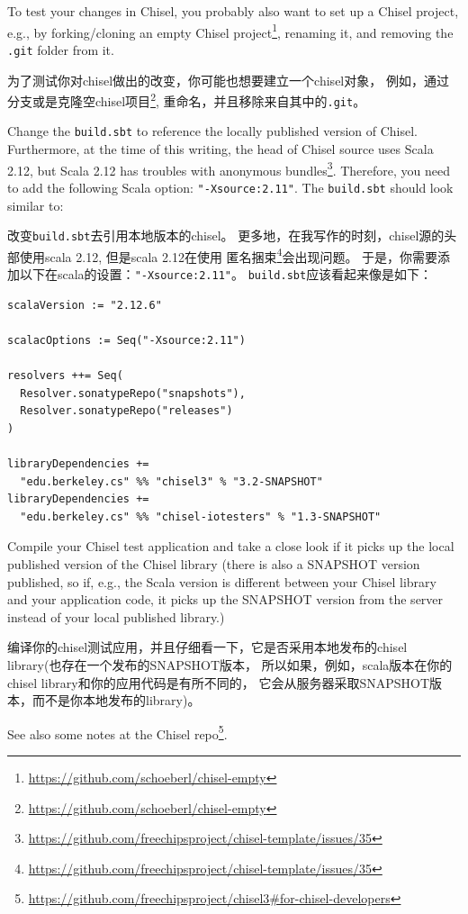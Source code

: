 \documentclass[%
    10pt,
    headinclude, footexclude,
    openright, %
    notitlepage,
    cleardoubleempty,
    headsepline,
    pointlessnumbers,
    bibtotoc, idxtotoc,
    ]{scrbook}
\newcommand{\code}[1]{{\small{\texttt{#1}}}}
\newcommand{\myref}[2]{\href{#1}{#2}}
\renewcommand{\myref}[2]{{#2}{\footnote{\url{#1}}}}
\begin{document}
To test your changes in Chisel, you probably also want to set up a Chisel project,
e.g., by forking/cloning an \myref{https://github.com/schoeberl/chisel-empty}{empty Chisel project},
renaming it, and removing the \code{.git} folder from it.

为了测试你对chisel做出的改变，你可能也想要建立一个chisel对象，
例如，通过分支或是克隆\myref{https://github.com/schoeberl/chisel-empty}{空chisel项目},
重命名，并且移除来自其中的\code{.git}。

Change the \code{build.sbt} to reference the locally published version of Chisel.
Furthermore, at the time of this writing, the head of Chisel source uses Scala 2.12, but Scala
2.12 has troubles with
\myref{https://github.com/freechipsproject/chisel-template/issues/35}{anonymous bundles}.
Therefore, you need to add the following Scala option: \code{"-Xsource:2.11"}.
The \code{build.sbt} should look similar to:

改变\code{build.sbt}去引用本地版本的chisel。
更多地，在我写作的时刻，chisel源的头部使用scala 2.12, 但是scala 2.12在使用
\myref{https://github.com/freechipsproject/chisel-template/issues/35}{匿名捆束}会出现问题。
于是，你需要添加以下在scala的设置：\code{"-Xsource:2.11"}。
\code{build.sbt}应该看起来像是如下：

\begin{verbatim}
scalaVersion := "2.12.6"

scalacOptions := Seq("-Xsource:2.11")

resolvers ++= Seq(
  Resolver.sonatypeRepo("snapshots"),
  Resolver.sonatypeRepo("releases")
)

libraryDependencies +=
  "edu.berkeley.cs" %% "chisel3" % "3.2-SNAPSHOT"
libraryDependencies +=
  "edu.berkeley.cs" %% "chisel-iotesters" % "1.3-SNAPSHOT"
\end{verbatim}

Compile your Chisel test application and take a close look if it picks up the local published
version of the Chisel library (there is also a SNAPSHOT version published, so if, e.g.,
the Scala version is different between your Chisel library and your application code,
it picks up the SNAPSHOT version from the server instead of your local published
library.)

编译你的chisel测试应用，并且仔细看一下，它是否采用本地发布的chisel library(也存在一个发布的SNAPSHOT版本，
所以如果，例如，scala版本在你的chisel library和你的应用代码是有所不同的，
它会从服务器采取SNAPSHOT版本，而不是你本地发布的library)。

See also \myref{https://github.com/freechipsproject/chisel3\#for-chisel-developers}{some notes
at the Chisel repo}.
\end{document}
